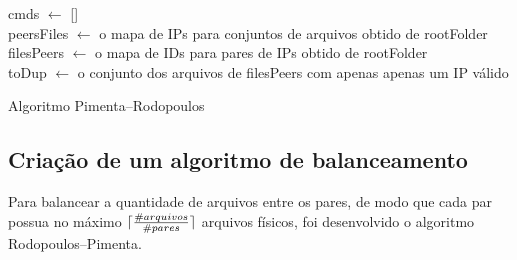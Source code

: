 \documentclass{article}
\DeclarePairedDelimiter{\ceil}{\lceil}{\rceil}
\begin{document}
\begin{algorithm}[H]
 cmds $\leftarrow$ [] \\
 peersFiles $\leftarrow$ o mapa de IPs para conjuntos de arquivos obtido de rootFolder \\
 filesPeers $\leftarrow$ o mapa de IDs para pares de IPs obtido de rootFolder \\
 toDup $\leftarrow$ o conjunto dos arquivos de filesPeers com apenas apenas um IP válido \\
 \caption{Algoritmo Pimenta--Rodopoulos}
\end{algorithm}

\subsection{Criação de um algoritmo de balanceamento}
\label{rodopoulos-pimenta}

\indent

Para balancear a quantidade de arquivos entre os pares, de modo que cada par possua no máximo $\ceil{\frac{\#arquivos}{\#pares}}$ arquivos físicos, foi desenvolvido o algoritmo Rodopoulos--Pimenta.
\end{document}
